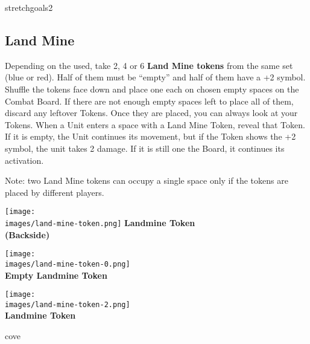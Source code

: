 \begin{multicols}{2}
\vspace*{\fill}
\columnbreak

\begin{expansion}{stretchgoals2}
    \subsection*{Land Mine}
    Depending on the  used, take 2, 4 or 6 \textbf{Land Mine tokens} from the same set  (blue or red).
    Half of them must be ``empty'' and half of them have a +2  symbol.
    Shuffle the tokens face down and place one each on chosen empty spaces on the Combat Board.
    If there are not enough empty spaces left to place all of them, discard any leftover Tokens.
    Once they are placed, you can always look at your Tokens.
    When a Unit enters a space with a Land Mine Token, reveal that Token.
    If it is empty, the Unit continues its movement, but if the Token shows the +2  symbol, the unit takes 2 damage.
    If it is still one the Board, it continues its activation.

    Note: two Land Mine tokens can occupy a single space only if the tokens are placed by different players.
    \bigskip
    \begin{multicols}{3}
        \centering
        \texttt{[image: \\images/land-mine-token.png]}
        \textbf{\scriptsize\color{darkcandyapplered}Landmine Token\\ (Backside)}

        \columnbreak
        \texttt{[image: \\images/land-mine-token-0.png]}\\
        \textbf{\scriptsize\color{darkcandyapplered}Empty Landmine Token\\}

        \columnbreak
        \texttt{[image: \\images/land-mine-token-2.png]}\\
        \textbf{\scriptsize\color{darkcandyapplered}Landmine Token\\}
    \end{multicols}
\end{expansion}
\columnbreak

\begin{expansion}{cove}

\end{expansion}
\end{multicols}
